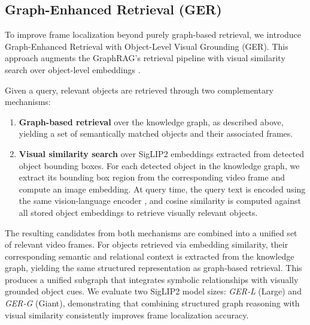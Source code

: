 \subsection{Graph-Enhanced Retrieval (GER)} \label{sec:ger}
To improve frame localization beyond purely graph-based retrieval, we introduce Graph-Enhanced Retrieval with Object-Level Visual Grounding (GER).
This approach augments the GraphRAG's retrieval pipeline \cite{Han2024RetrievalAugmentedGW} with visual similarity search over object-level embeddings \cite{tschannen2025siglip}.

Given a query, relevant objects are retrieved through two complementary mechanisms:
\begin{enumerate}
    \item[(i)] \textbf{Graph-based retrieval} over the knowledge graph, as described above, yielding a set of semantically matched objects and their associated frames.
    \item[(ii)] \textbf{Visual similarity search} over SigLIP2 embeddings \cite{tschannen2025siglip} extracted from detected object bounding boxes. For each detected object in the knowledge graph, we extract its bounding box region from the corresponding video frame and compute an image embedding. At query time, the query text is encoded using the same vision-language encoder \cite{tschannen2025siglip}, and cosine similarity is computed against all stored object embeddings to retrieve visually relevant objects.
\end{enumerate}

The resulting candidates from both mechanisms are combined into a unified set of relevant video frames.
For objects retrieved via embedding similarity, their corresponding semantic and relational context is extracted from the knowledge graph, yielding the same structured representation as graph-based retrieval.
This produces a unified subgraph that integrates symbolic relationships with visually grounded object cues.
We evaluate two SigLIP2 model sizes: \emph{GER-L} (Large) and \emph{GER-G} (Giant), demonstrating that combining structured graph reasoning with visual similarity consistently improves frame localization accuracy.


